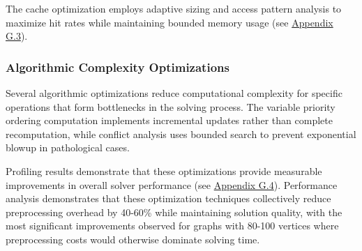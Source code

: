 The cache optimization employs adaptive sizing and access pattern analysis to maximize hit rates while maintaining bounded memory usage (see \hyperref[appendix:cache-optimization]{Appendix G.3}).

\subsubsection{Algorithmic Complexity Optimizations}

Several algorithmic optimizations reduce computational complexity for specific operations that form bottlenecks in the solving process. The variable priority ordering computation implements incremental updates rather than complete recomputation, while conflict analysis uses bounded search to prevent exponential blowup in pathological cases.

Profiling results demonstrate that these optimizations provide measurable improvements in overall solver performance (see \hyperref[appendix:complexity-optimization]{Appendix G.4}). Performance analysis demonstrates that these optimization techniques collectively reduce preprocessing overhead by 40-60\% while maintaining solution quality, with the most significant improvements observed for graphs with 80-100 vertices where preprocessing costs would otherwise dominate solving time.
